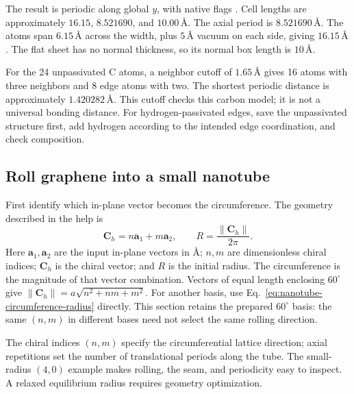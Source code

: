 The result is periodic along global $y$, with native flags . Cell lengths are approximately $16.15$, $8.521690$, and $10.00\,\text{\AA}$. The axial period is $8.521690\,\text{\AA}$. The atoms span $6.15\,\text{\AA}$ across the width, plus $5\,\text{\AA}$ vacuum on each side, giving $16.15\,\text{\AA}$. The flat sheet has no normal thickness, so its normal box length is $10\,\text{\AA}$.

For the 24 unpassivated C atoms, a neighbor cutoff of $1.65\,\text{\AA}$ gives 16 atoms with three neighbors and 8 edge atoms with two. The shortest periodic distance is approximately $1.420282\,\text{\AA}$. This cutoff checks this carbon model; it is not a universal bonding distance. For hydrogen-passivated edges, save the unpassivated structure first, add hydrogen according to the intended edge coordination, and check composition.

\subsection{Roll graphene into a small nanotube}

First identify which in-plane vector becomes the circumference. The geometry described in the help is
\begin{equation}
  \mathbf C_h=n\mathbf a_1+m\mathbf a_2,
  \qquad R=\frac{\|\mathbf C_h\|}{2\pi}.
  \label{eq:nanotube-circumference-radius}
\end{equation}
Here $\mathbf a_1,\mathbf a_2$ are the input in-plane vectors in \AA; $n,m$ are dimensionless chiral indices; $\mathbf C_h$ is the chiral vector; and $R$ is the initial radius. The circumference is the magnitude of that vector combination. Vectors of equal length enclosing $60^\circ$ give $\|\mathbf C_h\|=a\sqrt{n^2+nm+m^2}$. For another basis, use Eq.~\eqref{eq:nanotube-circumference-radius} directly. This section retains the prepared $60^\circ$ basis: the same $(n,m)$ in different bases need not select the same rolling direction.



The chiral indices $(n,m)$ specify the circumferential lattice direction; axial repetitions set the number of translational periods along the tube. The small-radius $(4,0)$ example makes rolling, the seam, and periodicity easy to inspect. A relaxed equilibrium radius requires geometry optimization.

